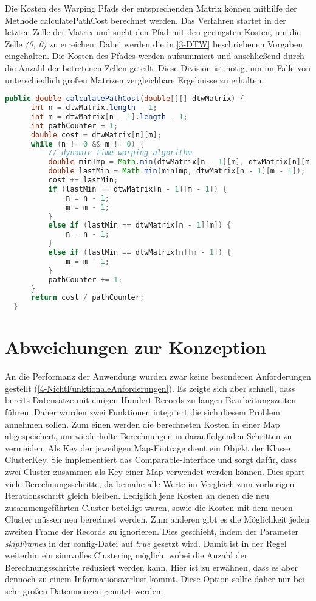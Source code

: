 Die Kosten des Warping Pfads der entsprechenden Matrix können mithilfe der Methode calculatePathCost
berechnet werden.
Das Verfahren startet in der letzten Zelle der Matrix und sucht den Pfad mit den geringsten Kosten,
um die Zelle \emph{(0, 0)} zu erreichen.
Dabei werden die in \autoref{3-DTW} beschriebenen Vorgaben eingehalten.
Die Kosten des Pfades werden aufsummiert und anschließend durch die Anzahl der betretenen Zellen geteilt.
Diese Division ist nötig, um im Falle von unterschiedlich großen Matrizen vergleichbare Ergebnisse zu erhalten.
\begin{lstlisting}[language=Java, caption=DTW: Warping Path berechnen.]
  public double calculatePathCost(double[][] dtwMatrix) {
      int n = dtwMatrix.length - 1;
      int m = dtwMatrix[n - 1].length - 1;
      int pathCounter = 1;
      double cost = dtwMatrix[n][m];
      while (n != 0 && m != 0) {
          // dynamic time warping algorithm
          double minTmp = Math.min(dtwMatrix[n - 1][m], dtwMatrix[n][m - 1]);
          double lastMin = Math.min(minTmp, dtwMatrix[n - 1][m - 1]);
          cost += lastMin;
          if (lastMin == dtwMatrix[n - 1][m - 1]) {
              n = n - 1;
              m = m - 1;
          }
          else if (lastMin == dtwMatrix[n - 1][m]) {
              n = n - 1;
          }
          else if (lastMin == dtwMatrix[n][m - 1]) {
              m = m - 1;
          }
          pathCounter += 1;
      }
      return cost / pathCounter;
  }
\end{lstlisting}

\section{Abweichungen zur Konzeption}
\label{5-AbweichungenKonzeption}
An die Performanz der Anwendung wurden zwar keine besonderen Anforderungen gestellt
(\autoref{4-NichtFunktionaleAnforderungen}).
Es zeigte sich aber schnell, dass bereits Datensätze mit einigen Hundert Records zu langen Bearbeitungszeiten führen.
Daher wurden zwei Funktionen integriert die sich diesem Problem annehmen sollen.
Zum einen werden die berechneten Kosten in einer Map abgespeichert,
um wiederholte Berechnungen in darauffolgenden Schritten zu vermeiden.
Als Key der jeweiligen Map-Einträge dient ein Objekt der Klasse ClusterKey.
Sie implementiert das Comparable-Interface und sorgt dafür,
dass zwei Cluster zusammen als Key einer Map verwendet werden können.
Dies spart viele Berechnungsschritte,
da beinahe alle Werte im Vergleich zum vorherigen Iterationsschritt gleich bleiben.
Lediglich jene Kosten an denen die neu zusammengeführten Cluster beteiligt waren,
sowie die Kosten mit dem neuen Cluster müssen neu berechnet werden.
Zum anderen gibt es die Möglichkeit jeden zweiten Frame der Records zu ignorieren.
Dies geschieht, indem der Parameter \emph{skipFrames} in der config-Datei auf \emph{true} gesetzt wird.
Damit ist in der Regel weiterhin ein sinnvolles Clustering möglich,
wobei die Anzahl der Berechnungsschritte reduziert werden kann.
Hier ist zu erwähnen, dass es aber dennoch zu einem Informationsverlust kommt.
Diese Option sollte daher nur bei sehr großen Datenmengen genutzt werden.

